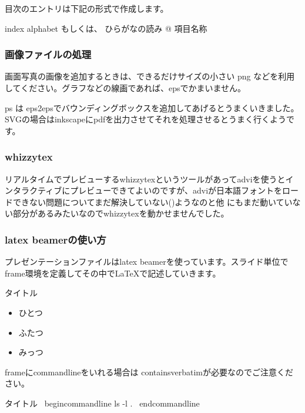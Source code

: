 \documentclass[mingoth,a4paper]{jsarticle}
\begin{document}
目次のエントリは下記の形式で作成します。
\begin{commandline}
index { alphabet もしくは、 ひらがなの読み @ 項目名称 } 
\end{commandline}

\subsubsection{画像ファイルの処理}

画面写真の画像を追加するときは、できるだけサイズの小さい png などを利用
してください。グラフなどの線画であれば、epsでかまいません。

ps は eps2epsでバウンディングボックスを追加してあげるとうまくいきました。
SVGの場合はinkscapeにpdfを出力させてそれを処理させるとうまく行くようです。

\subsubsection{whizzytex}

リアルタイムでプレビューするwhizzytexというツールがあってadviを使うとイ
ンタラクティブにプレビューできてよいのですが、adviが日本語フォントをロー
ドできない問題についてまだ解決していない()ようなのと他
にもまだ動いていない部分があるみたいなのでwhizzytexを動かせませんでした。

\subsubsection{latex beamerの使い方}

プレゼンテーションファイルはlatex beamerを使っています。スライド単位で
frame環境を定義してその中でLaTeXで記述していきます。

\begin{commandline}
\begin{frame}{タイトル}
  \begin{itemize}
    \item ひとつ
    \item ふたつ
    \item みっつ
  \end{itemize}
\end{frame}
\end{commandline}

frameにcommandlineをいれる場合は containsverbatimが必要なのでご注意くだ
さい。

\begin{commandline}
 \begin{frame}[containsverbatim]{タイトル}
   \ begin{commandline}
ls -l .
   \ end{commandline}
 \end{frame}
\end{commandline}
\end{document}
